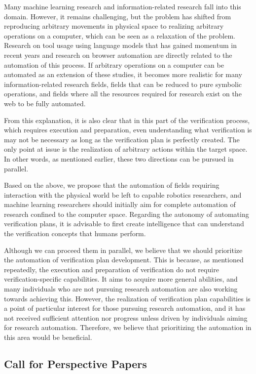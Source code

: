 \documentclass{book}
\begin{document}
Many machine learning research and information-related research fall into this domain. However, it remains challenging, but the problem has shifted from reproducing arbitrary movements in physical space to realizing arbitrary operations on a computer, which can be seen as a relaxation of the problem. Research on tool usage using language models that has gained momentum in recent years and research on browser automation are directly related to the automation of this process. If arbitrary operations on a computer can be automated as an extension of these studies, it becomes more realistic for many information-related research fields, fields that can be reduced to pure symbolic operations, and fields where all the resources required for research exist on the web to be fully automated.

From this explanation, it is also clear that in this part of the verification process, which requires execution and preparation, even understanding what verification is may not be necessary as long as the verification plan is perfectly created. The only point at issue is the realization of arbitrary actions within the target space. In other words, as mentioned earlier, these two directions can be pursued in parallel.

Based on the above, we propose that the automation of fields requiring interaction with the physical world be left to capable robotics researchers, and machine learning researchers should initially aim for complete automation of research confined to the computer space. Regarding the autonomy of automating verification plans, it is advisable to first create intelligence that can understand the verification concepts that humans perform. 

Although we can proceed them in parallel, we believe that we should prioritize the automation of verification plan development. This is because, as mentioned repeatedly, the execution and preparation of verification do not require verification-specific capabilities. It aims to acquire more general abilities, and many individuals who are not pursuing research automation are also working towards achieving this. However, the realization of verification plan capabilities is a point of particular interest for those pursuing research automation, and it has not received sufficient attention nor progress unless driven by individuals aiming for research automation. Therefore, we believe that prioritizing the automation in this area would be beneficial.

\subsection{Call for Perspective Papers}
\end{document}

